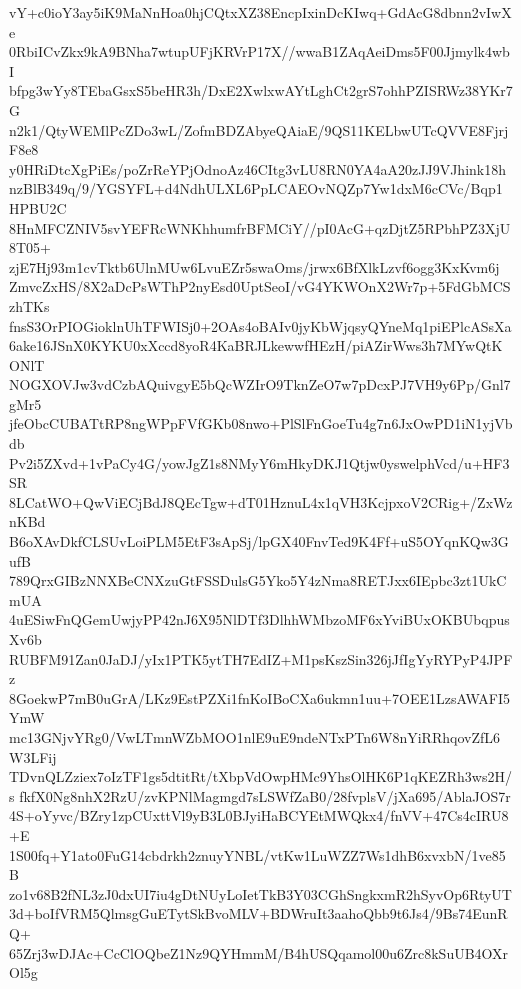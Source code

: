 vY+c0ioY3ay5iK9MaNnHoa0hjCQtxXZ38EncpIxinDcKIwq+GdAcG8dbnn2vIwXe
0RbiICvZkx9kA9BNha7wtupUFjKRVrP17X//wwaB1ZAqAeiDms5F00Jjmylk4wbI
bfpg3wYy8TEbaGsxS5beHR3h/DxE2XwlxwAYtLghCt2grS7ohhPZISRWz38YKr7G
n2k1/QtyWEMlPcZDo3wL/ZofmBDZAbyeQAiaE/9QS11KELbwUTcQVVE8FjrjF8e8
y0HRiDtcXgPiEs/poZrReYPjOdnoAz46CItg3vLU8RN0YA4aA20zJJ9VJhink18h
nzBlB349q/9/YGSYFL+d4NdhULXL6PpLCAEOvNQZp7Yw1dxM6cCVc/Bqp1HPBU2C
8HnMFCZNIV5svYEFRcWNKhhumfrBFMCiY//pI0AcG+qzDjtZ5RPbhPZ3XjU8T05+
zjE7Hj93m1cvTktb6UlnMUw6LvuEZr5swaOms/jrwx6BfXlkLzvf6ogg3KxKvm6j
ZmvcZxHS/8X2aDcPsWThP2nyEsd0UptSeoI/vG4YKWOnX2Wr7p+5FdGbMCSzhTKs
fnsS3OrPIOGioklnUhTFWISj0+2OAs4oBAIv0jyKbWjqsyQYneMq1piEPlcASsXa
6ake16JSnX0KYKU0xXccd8yoR4KaBRJLkewwfHEzH/piAZirWws3h7MYwQtKONlT
NOGXOVJw3vdCzbAQuivgyE5bQcWZIrO9TknZeO7w7pDcxPJ7VH9y6Pp/Gnl7gMr5
jfeObcCUBATtRP8ngWPpFVfGKb08nwo+PlSlFnGoeTu4g7n6JxOwPD1iN1yjVbdb
Pv2i5ZXvd+1vPaCy4G/yowJgZ1s8NMyY6mHkyDKJ1Qtjw0yswelphVcd/u+HF3SR
8LCatWO+QwViECjBdJ8QEcTgw+dT01HznuL4x1qVH3KcjpxoV2CRig+/ZxWznKBd
B6oXAvDkfCLSUvLoiPLM5EtF3sApSj/lpGX40FnvTed9K4Ff+uS5OYqnKQw3GufB
789QrxGIBzNNXBeCNXzuGtFSSDulsG5Yko5Y4zNma8RETJxx6IEpbc3zt1UkCmUA
4uESiwFnQGemUwjyPP42nJ6X95NlDTf3DlhhWMbzoMF6xYviBUxOKBUbqpusXv6b
RUBFM91Zan0JaDJ/yIx1PTK5ytTH7EdIZ+M1psKszSin326jJfIgYyRYPyP4JPFz
8GoekwP7mB0uGrA/LKz9EstPZXi1fnKoIBoCXa6ukmn1uu+7OEE1LzsAWAFI5YmW
mc13GNjvYRg0/VwLTmnWZbMOO1nlE9uE9ndeNTxPTn6W8nYiRRhqovZfL6W3LFij
TDvnQLZziex7oIzTF1gs5dtitRt/tXbpVdOwpHMc9YhsOlHK6P1qKEZRh3ws2H/s
fkfX0Ng8nhX2RzU/zvKPNlMagmgd7sLSWfZaB0/28fvplsV/jXa695/AblaJOS7r
4S+oYyvc/BZry1zpCUxttVl9yB3L0BJyiHaBCYEtMWQkx4/fnVV+47Cs4cIRU8+E
1S00fq+Y1ato0FuG14cbdrkh2znuyYNBL/vtKw1LuWZZ7Ws1dhB6xvxbN/1ve85B
zo1v68B2fNL3zJ0dxUI7iu4gDtNUyLoIetTkB3Y03CGhSngkxmR2hSyvOp6RtyUT
3d+boIfVRM5QlmsgGuETytSkBvoMLV+BDWruIt3aahoQbb9t6Js4/9Bs74EunRQ+
65Zrj3wDJAc+CcClOQbeZ1Nz9QYHmmM/B4hUSQqamol00u6Zrc8kSuUB4OXrOl5g
